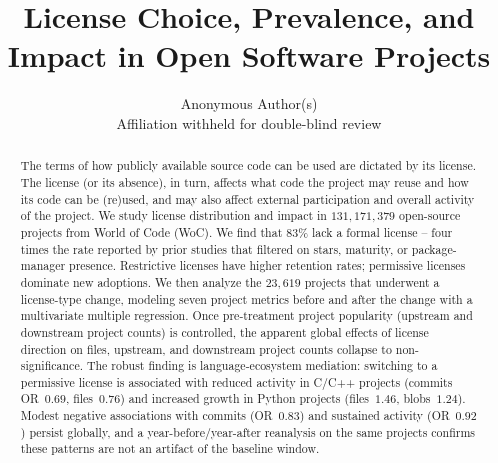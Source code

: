 \documentclass[10pt,conference]{IEEEtran}
\begin{document}
\title{License Choice, Prevalence, and Impact in Open Software Projects}

\author{
  Anonymous Author(s)\\
  Affiliation withheld for double-blind review
}


\maketitle

\begin{abstract}
The terms of how publicly available source code can be used are dictated
by its license. The license (or its absence), in turn, affects what code
the project may reuse and how its code can be (re)used, and may also
affect external participation and overall activity of the project. We
study license distribution and impact in $131{,}171{,}379$ open-source
projects from World of Code (WoC). We find that $83\%$ lack a formal
license -- four times the rate reported by prior studies that filtered
on stars, maturity, or package-manager presence. Restrictive licenses
have higher retention rates; permissive licenses dominate new adoptions.
We then analyze the $23{,}619$ projects that underwent a license-type
change, modeling seven project metrics before and after the change with
a multivariate multiple regression. Once pre-treatment project
popularity (upstream and downstream project counts) is controlled, the
apparent global effects of license direction on files, upstream, and
downstream project counts collapse to non-significance. The robust
finding is language-ecosystem mediation: switching to a permissive
license is associated with reduced activity in C/C++ projects (commits
OR~$0.69$, files~$0.76$) and increased growth in Python projects
(files~$1.46$, blobs~$1.24$). Modest negative associations with commits
(OR~$0.83$) and sustained activity (OR~$0.92$) persist globally, and a
year-before/year-after reanalysis on the same projects confirms these
patterns are not an artifact of the baseline window.
\end{abstract}
\end{document}
